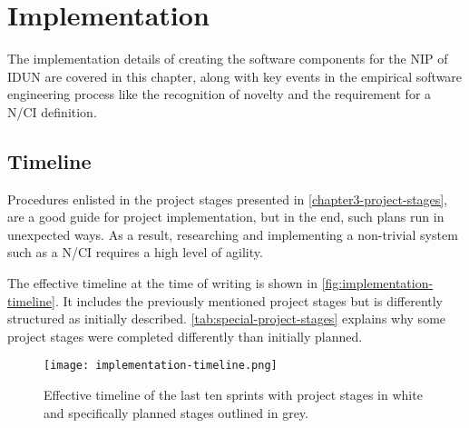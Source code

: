 \chapter{Implementation}
\graphicspath{{Chapter4/Figs/}{Chapter4/Figs/}}

The implementation details of creating the software components for the NIP of IDUN are covered in this chapter, along with key events in the empirical software engineering process like the recognition of novelty and the requirement for a N/CI definition.

\section{Timeline}
\label{chapter4-timeline}

Procedures enlisted in the project stages presented in \autoref{chapter3-project-stages}, are a good guide for project implementation, but in the end, such plans run in unexpected ways. As a result, researching and implementing a non-trivial system such as a N/CI requires a high level of agility.

The effective timeline at the time of writing is shown in \autoref{fig:implementation-timeline}. It includes the previously mentioned project stages but is differently structured as initially described. \autoref{tab:special-project-stages} explains why some project stages were completed differently than initially planned.

\begin{figure}[!ht]
  \centering
  \texttt{[image: implementation-timeline.png]}
  \caption{Effective timeline of the last ten sprints with project stages in white and specifically planned stages outlined in grey.}
  \label{fig:implementation-timeline}
\end{figure}

